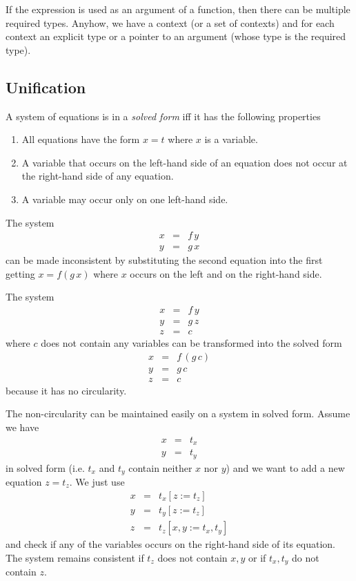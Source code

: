 If the expression is used as an argument of a function, then there can be
multiple required types. Anyhow, we have a context (or a set of contexts) and
for each context an explicit type or a pointer to an argument (whose type is
the required type).




\subsection{Unification}


A system of equations is in a \emph{solved form} iff it has the following
properties
%
\begin{enumerate}

\item All equations have the form $x = t$ where $x$ is a variable.

\item A variable that occurs on the left-hand side of an equation does not
  occur at the right-hand side of any equation.

\item A variable may occur only on one left-hand side.
\end{enumerate}

The system
$$
%
\begin{array}{lll}
  x &=& f\, y
  \\
  y &=& g\, x
\end{array}
$$
%
can be made inconsistent by substituting the second equation into the first
getting $x = f (g\, x)$ where $x$ occurs on the left and on the right-hand side.

The system
$$
\begin{array}{lll}
  x &=& f\, y
  \\
  y &=& g\, z
  \\
  z &=& c
\end{array}
$$
%
where $c$ does not contain any variables can be transformed into the solved
form
$$
\begin{array}{lll}
  x &=& f\, (g \, c)
  \\
  y &=& g\, c
  \\
  z &=& c
\end{array}
$$
%
because it has no circularity.

The non-circularity can be maintained easily on a system in solved
form. Assume we have
$$
%
\begin{array}{lll}
  x &=& t_x
  \\
  y &=& t_y
\end{array}
$$
%
in solved form (i.e. $t_x$ and $t_y$ contain neither $x$ nor $y$) and we want
to add a new equation $z = t_z$. We just use
$$
%
\begin{array}{lll}
  x &=& t_x[z := t_z]
  \\
  y &=& t_y[z := t_z]
  \\
  z &=& t_z[x,y := t_x, t_y]
\end{array}
$$
%
and check if any of the variables occurs on the right-hand side of its
equation. The system remains consistent if $t_z$ does not contain $x,y$ or if
$t_x,t_y$ do not contain $z$.


